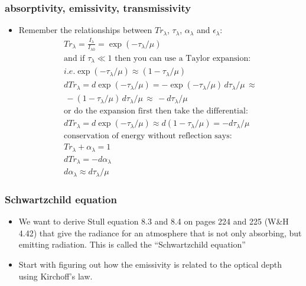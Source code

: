 \documentclass[hyperref={colorlinks=true,linkcolor=blue,urlcolor=blue},numbers]{beamer}
\begin{document}
\begin{frame}
  \frametitle{absorptivity, emissivity, transmissivity}

\begin{itemize}



\item Remember the relationships between 
$Tr_\lambda$, $\tau_\lambda$, $\alpha_\lambda$ and $\epsilon_\lambda$:
  \begin{gather*}
Tr_\lambda = \frac{I_{\lambda}}{I_{\lambda 0}} = \exp ( - \tau_\lambda/\mu ) \\
\text{and if $\tau_\lambda \ll 1$ then you can use a Taylor expansion}:\\
i.e. \exp(-\tau_\lambda/\mu) \approx (1 -\tau_\lambda/\mu) \\
  d Tr_\lambda = d \exp(-\tau_\lambda/\mu) = - \exp(-\tau_\lambda/\mu)\, d\tau_\lambda/\mu \, \approx\\
 \, - (1 -\tau_\lambda/\mu)\, d\tau_\lambda/\mu
 \, \approx \,- d\tau_\lambda/\mu\\
\text{or do the expansion first then take the differential: } \\
  d Tr_\lambda = d \exp(-\tau_\lambda/\mu) \approx  d(1 -\tau_\lambda/\mu)
=  - d\tau_\lambda/\mu\\
\text{conservation of energy without reflection says:}\\
  Tr_\lambda + \alpha_\lambda =1 \\
  dTr_\lambda = - d\alpha_\lambda\\
  d\alpha_\lambda \approx d\tau_\lambda/\mu
  \end{gather*}


\end{itemize}

\end{frame}

\begin{frame}
  \frametitle{Schwartzchild equation}

  \begin{itemize}
  \item We want to derive Stull equation 8.3 and 8.4 on pages 224 and 225 (W\&H 4.42)
that give the radiance for an atmosphere that is not only absorbing, but emitting radiation.
This is called the ``Schwartzchild equation''

\item Start with figuring out how the emissivity is related to the optical depth
using Kirchoff's law.

  \end{itemize}
\end{frame}
\end{document}
